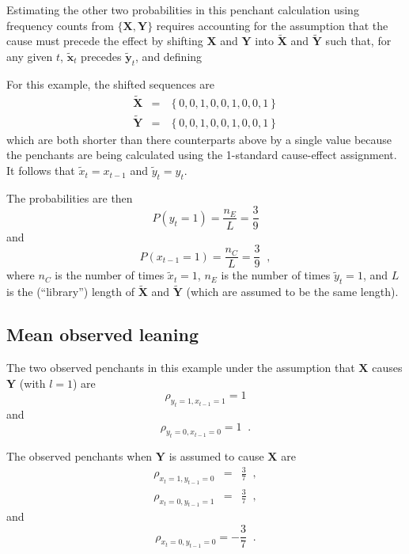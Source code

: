 \documentclass[twocolumn,aps,pre,groupedaddress]{revtex4-1}
\begin{document}
Estimating the other two probabilities in this penchant calculation using frequency counts from $\{\mathbf{X},\mathbf{Y}\}$ requires accounting for the assumption that the cause must precede the effect by shifting $\mathbf{X}$ and $\mathbf{Y}$ into $\tilde{\mathbf{X}}$ and $\tilde{\mathbf{Y}}$ such that, for any given $t$, $\tilde{\mathbf{x}}_t$ precedes $\tilde{\mathbf{y}}_t$, and defining

For this example, the shifted sequences are
\begin{eqnarray*}
\tilde{\mathbf{X}} &=& \left\{0,0,1,0,0,1,0,0,1\right\}\\
\tilde{\mathbf{Y}} &=& \left\{0,0,1,0,0,1,0,0,1\right\}
\end{eqnarray*}
which are both shorter than there counterparts above by a single value because the penchants are being calculated using the 1-standard cause-effect assignment. It follows that $\tilde{x}_t = x_{t-1}$ and $\tilde{y}_t=y_t$.  

The probabilities are then
\begin{equation}
P\left( y_t = 1\right) = \frac{n_E}{L} = \frac{3}{9}
\end{equation}
and
\begin{equation}
P\left( x_{t-1} = 1\right) = \frac{n_C}{L} = \frac{3}{9}\;\;,
\end{equation}
where $n_C$ is the number of times $\tilde{x}_t = 1$, $n_E$ is the number of times $\tilde{y}_t = 1$, and $L$ is the (``library'') length of $\tilde{\mathbf{X}}$ and $\tilde{\mathbf{Y}}$ (which are assumed to be the same length).  

\subsection{Mean observed leaning}
\label{sec:meanlean}
The two observed penchants in this example under the assumption that $\mathbf{X}$ causes $\mathbf{Y}$ (with $l=1$) are
\begin{equation}
\label{eqn:rhoex1}
\rho_{y_t=1,x_{t-1}=1}=1
\end{equation}
and
\begin{equation*}
\rho_{y_t=0,x_{t-1}=0}=1\;\;.
\end{equation*}

The observed penchants when $\mathbf{Y}$ is assumed to cause $\mathbf{X}$ are
\begin{eqnarray*}
\rho_{x_t=1,y_{t-1}=0} &=& \frac{3}{7}\;\;,\\
\rho_{x_t=0,y_{t-1}=1} &=& \frac{3}{7}\;\;,
\end{eqnarray*}
and
\begin{equation*}
\rho_{x_t=0,y_{t-1}=0}=-\frac{3}{7}\;\;.
\end{equation*}
\end{document}
